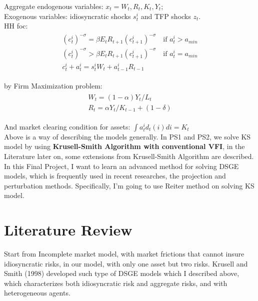 Aggregate endogenous variables: $x_t = W_t,R_t,K_t,Y_t$;\\

Exogenous variables: idiosyncratic shocks $s^i_t$ and TFP shocks $z_t$.\\

HH foc: 
\begin{align}
\begin{split}
(c^i_t)^{-\sigma} = \beta E_t R_{t+1}(c^i_{t+1})^{-\sigma} \quad \text{if } a^i_t > a_{min} \\
(c^i_t)^{-\sigma} > \beta E_t R_{t+1}(c^i_{t+1})^{-\sigma} \quad \text{if } a^i_t = a_{min} \\
c^i_t + a^i_t = s^i_t W_t + a^i_{t-1} R_{t-1}
\end{split}\label{hhfoc}
\end{align}

by Firm Maximization problem: 
\begin{align}
\begin{split}
W_t = (1-\alpha)Y_t/L_{t} \\
R_t = \alpha Y_t/K_{t-1} + (1- \delta)
\end{split}
\end{align} 


And market clearing condition for assets: $\int a^i_t d_t (i)di = K_t$\\

Above is a way of describing the models generally. In {\color{red} PS1 and PS2}, we solve KS model by using \textbf{Krusell-Smith Algorithm with conventional VFI}, in the Literature later on, some extensions from Krusell-Smith Algorithm are described. In this Final Project, I want to learn an advanced method for solving DSGE models, which is frequently used in recent researches, the projection and perturbation methods. Specifically, I'm going to use Reiter method on solving KS model.\\

\section{Literature Review}\label{secLiter}

Start from Incomplete market model, with market frictions that cannot insure idiosyncratic risks, in our model, with only one asset but two risks. Krusell and Smith (1998) \cite{krusell1998income} developed such type of DSGE models which I described above, which characterizes both idiosyncratic risk and aggregate risks, and with heterogeneous agents.

